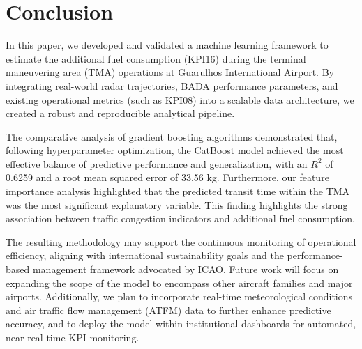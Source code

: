 \section{Conclusion}
\label{sec:conclusion}

In this paper, we developed and validated a machine learning framework to estimate the additional fuel consumption (KPI16) during the terminal maneuvering area (TMA) operations at Guarulhos International Airport. By integrating real-world radar trajectories, BADA performance parameters, and existing operational metrics (such as KPI08) into a scalable data architecture, we created a robust and reproducible analytical pipeline.

The comparative analysis of gradient boosting algorithms demonstrated that, following hyperparameter optimization, the CatBoost model achieved the most effective balance of predictive performance and generalization, with an $R^2$ of 0.6259 and a root mean squared error of 33.56 kg. Furthermore, our feature importance analysis highlighted that the predicted transit time within the TMA was the most significant explanatory variable. This finding highlights the strong association between traffic congestion indicators and additional fuel consumption.

The resulting methodology may support the continuous monitoring of operational efficiency, aligning with international sustainability goals and the performance-based management framework advocated by ICAO. Future work will focus on expanding the scope of the model to encompass other aircraft families and major airports. Additionally, we plan to incorporate real-time meteorological conditions and air traffic flow management (ATFM) data to further enhance predictive accuracy, and to deploy the model within institutional dashboards for automated, near real-time KPI monitoring.